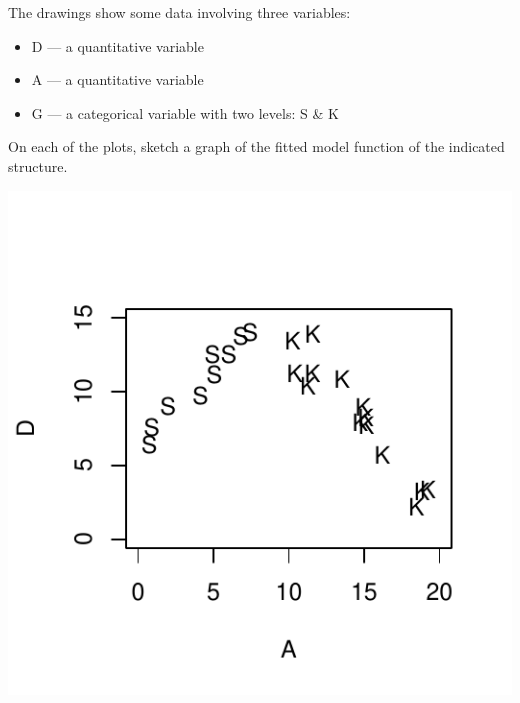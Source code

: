 




The drawings show some data involving three variables:
\begin{itemize}
  \item D --- a quantitative variable
  \item A --- a quantitative variable
  \item G --- a categorical variable with two levels: S \& K
\end{itemize}
On each of the plots, sketch a graph of the fitted model function of the indicated structure.


\includegraphics{Figures/fig-fig-4-3-main}


